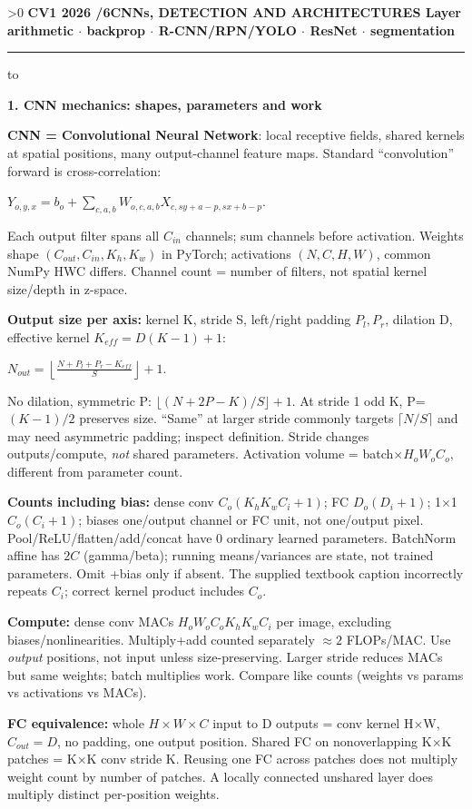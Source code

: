 \documentclass[a4paper]{article}
\newcommand{\key}[1]{\textbf{#1}}
\newcommand{\Topic}[1]{\par\vspace{1.7pt}\noindent
  {\fontsize{7.7}{8.0}\selectfont\bfseries #1}\par\vspace{0.3pt}}
\newcommand{\eq}[1]{\par\noindent\mbox{\(\displaystyle #1\)}\par}
\newcounter{sheet}
\newcounter{sheetcolumn}
\newlength{\colwidth}
\newcommand{\Sheet}[2]{\ifnum\value{sheet}>0\newpage\fi
  \stepcounter{sheet}\setcounter{sheetcolumn}{0}
  {\fontsize{8.5}{9}\selectfont\bfseries CV1 2026 \quad \thesheet/6\quad #1
  \hfill {\fontsize{6.3}{7}\selectfont #2}}\par
  \vspace{-1pt}\hrule height 0.35pt\vspace{2pt}\noindent
  \hbox to\textwidth\bgroup\ignorespaces}
\newenvironment{sheetcol}[1][7.0]{\stepcounter{sheetcolumn}
  \begin{lrbox}{\columnbox}\begin{minipage}[t]{\colwidth}\vspace{0pt}
  \fontsize{#1}{\dimexpr#1pt+0.6pt\relax}\selectfont}
  {\end{minipage}\end{lrbox}
  \typeout{CV1COL|\thesheet|\thesheetcolumn|\the\dimexpr\ht\columnbox+\dp\columnbox\relax}
  \usebox{\columnbox}\ignorespacesafterend}
\begin{document}
\Sheet{CNNs, DETECTION AND ARCHITECTURES}{Layer arithmetic \(\cdot\) backprop \(\cdot\) R-CNN/RPN/YOLO \(\cdot\) ResNet \(\cdot\) segmentation}
\begin{sheetcol}
\Topic{1. CNN mechanics: shapes, parameters and work}
\key{CNN = Convolutional Neural Network}: local receptive fields, shared kernels at spatial positions, many output-channel feature maps. Standard ``convolution'' forward is cross-correlation:
\eq{Y_{o,y,x}=b_o+\sum_{c,a,b}W_{o,c,a,b}
 X_{c,sy+a-p,sx+b-p}.}
Each output filter spans all \(C_{in}\) channels; sum channels before activation. Weights shape \((C_{out},C_{in},K_h,K_w)\) in PyTorch; activations \((N,C,H,W)\), common NumPy HWC differs. Channel count = number of filters, not spatial kernel size/depth in z-space.

\key{Output size per axis:} kernel K, stride S, left/right padding \(P_l,P_r\), dilation D, effective kernel \(K_{eff}=D(K-1)+1\):
\eq{N_{out}=\left\lfloor\frac{N+P_l+P_r-K_{eff}}S\right\rfloor+1.}
No dilation, symmetric P: \(\lfloor(N+2P-K)/S\rfloor+1\). At stride 1 odd K, P=\((K-1)/2\) preserves size. ``Same'' at larger stride commonly targets \(\lceil N/S\rceil\) and may need asymmetric padding; inspect definition. Stride changes outputs/compute, \emph{not} shared parameters. Activation volume = batch\(\times H_oW_oC_o\), different from parameter count.

\key{Counts including bias:} dense conv \(C_o(K_hK_wC_i+1)\); FC \(D_o(D_i+1)\); 1\(\times\)1 \(C_o(C_i+1)\); biases one/output channel or FC unit, not one/output pixel. Pool/ReLU/flatten/add/concat have 0 ordinary learned parameters. BatchNorm affine has \(2C\) (gamma/beta); running means/variances are state, not trained parameters. Omit +bias only if absent. The supplied textbook caption incorrectly repeats \(C_i\); correct kernel product includes \(C_o\).

\key{Compute:} dense conv MACs \(H_oW_oC_oK_hK_wC_i\) per image, excluding biases/nonlinearities. Multiply+add counted separately \(\approx2\) FLOPs/MAC. Use \emph{output} positions, not input unless size-preserving. Larger stride reduces MACs but same weights; batch multiplies work. Compare like counts (weights vs params vs activations vs MACs).

\key{FC equivalence:} whole \(H\!\times\!W\!\times\!C\) input to D outputs = conv kernel H\(\times\)W, \(C_{out}=D\), no padding, one output position. Shared FC on nonoverlapping K\(\times\)K patches = K\(\times\)K conv stride K. Reusing one FC across patches does not multiply weight count by number of patches. A locally connected unshared layer does multiply distinct per-position weights.


\end{sheetcol}
\end{document}
